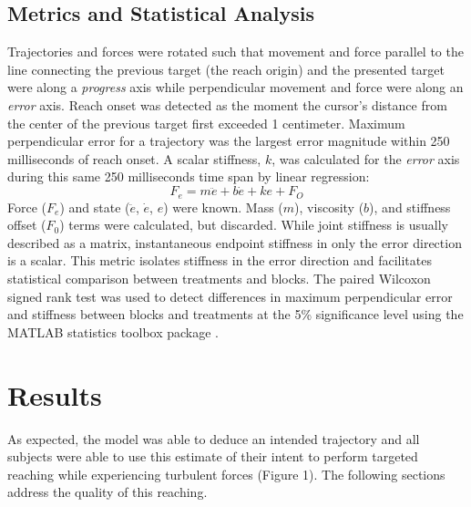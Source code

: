 \documentclass{frontiersSCNS} %
\begin{document}
\begin{methods}
\subsection{Metrics and Statistical Analysis}
Trajectories and forces were rotated such that movement and force parallel to the line connecting the previous target (the reach origin) and the presented target were along a \textit{progress} axis while perpendicular movement and force were along an \textit{error} axis. Reach onset was detected as the moment the cursor's distance from the center of the previous target first exceeded 1 centimeter. Maximum perpendicular error for a trajectory was the largest error magnitude within 250 milliseconds of reach onset. A scalar stiffness, $k$, was calculated for the \textit{error} axis during this same 250 milliseconds time span by linear regression:
\begin{equation}
F_e=m\ddot{e}+b\dot{e}+ke+F_O
\end{equation}
Force ($F_e$) and state ($\ddot{e}$, $\dot{e}$, $e$) were known. Mass ($m$), viscosity ($b$), and stiffness offset ($F_0$) terms were calculated, but discarded. While joint stiffness is usually described as a matrix, instantaneous endpoint stiffness in only the error direction is a scalar. This metric isolates stiffness in the error direction and facilitates statistical comparison between treatments and blocks. The paired Wilcoxon signed rank test was used to detect differences in maximum perpendicular error and stiffness between blocks and treatments at the 5\% significance level using the MATLAB statistics toolbox package \cite{MATLAB:2014}.
\end{methods}


\section{Results}
As expected, the model was able to deduce an intended trajectory and all subjects were able to use this estimate of their intent to perform targeted reaching while experiencing turbulent forces (Figure 1). The following sections address the quality of this reaching.
\end{document}
